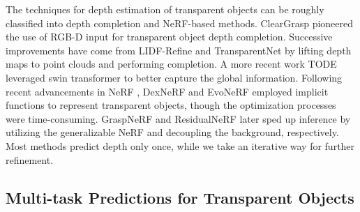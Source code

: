 The techniques for depth estimation of transparent objects can be roughly classified into depth completion and NeRF-based methods. ClearGrasp \cite{c7} pioneered the use of RGB-D input for transparent object depth completion. Successive improvements have come from LIDF-Refine \cite{c23} and TransparentNet \cite{c24} by lifting depth maps to point clouds and performing completion. A more recent work TODE \cite{c10} leveraged swin transformer \cite{c25} to better capture the global information. Following recent advancements in NeRF \cite{c16}, DexNeRF \cite{c11} and EvoNeRF \cite{c12} employed implicit functions to represent transparent objects, though the optimization processes were time-consuming. GraspNeRF \cite{c13} and ResidualNeRF \cite{c44} later sped up inference by utilizing the generalizable NeRF and decoupling the background, respectively. Most methods predict depth only once, while we take an iterative way for further refinement.

\subsection{Multi-task Predictions for Transparent Objects}

